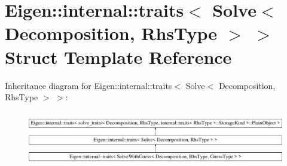 \hypertarget{struct_eigen_1_1internal_1_1traits_3_01_solve_3_01_decomposition_00_01_rhs_type_01_4_01_4}{}\section{Eigen\+::internal\+::traits$<$ Solve$<$ Decomposition, Rhs\+Type $>$ $>$ Struct Template Reference}
\label{struct_eigen_1_1internal_1_1traits_3_01_solve_3_01_decomposition_00_01_rhs_type_01_4_01_4}
Inheritance diagram for Eigen\+::internal\+::traits$<$ Solve$<$ Decomposition, Rhs\+Type $>$ $>$\+:\begin{figure}[H]
\begin{center}
\leavevmode
\includegraphics[height=2.441860cm]{struct_eigen_1_1internal_1_1traits_3_01_solve_3_01_decomposition_00_01_rhs_type_01_4_01_4}
\end{center}
\end{figure}
